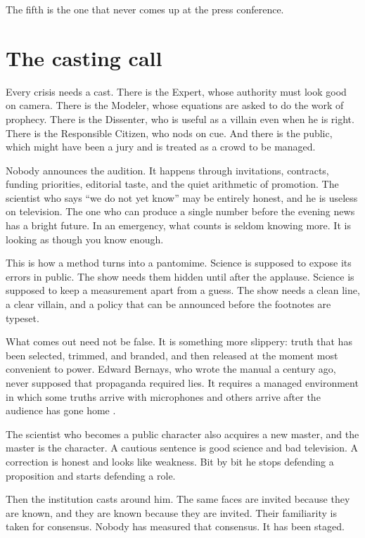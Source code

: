 \documentclass[12pt,a4paper]{book}
\begin{document}
The fifth is the one that never comes up at the press conference.

\section{The casting call}

Every crisis needs a cast. There is the Expert, whose authority must look good on camera. There is the Modeler, whose equations are asked to do the work of prophecy. There is the Dissenter, who is useful as a villain even when he is right. There is the Responsible Citizen, who nods on cue. And there is the public, which might have been a jury and is treated as a crowd to be managed.

Nobody announces the audition. It happens through invitations, contracts, funding priorities, editorial taste, and the quiet arithmetic of promotion. The scientist who says ``we do not yet know'' may be entirely honest, and he is useless on television. The one who can produce a single number before the evening news has a bright future. In an emergency, what counts is seldom knowing more. It is looking as though you know enough.

This is how a method turns into a pantomime. Science is supposed to expose its errors in public. The show needs them hidden until after the applause. Science is supposed to keep a measurement apart from a guess. The show needs a clean line, a clear villain, and a policy that can be announced before the footnotes are typeset.

What comes out need not be false. It is something more slippery: truth that has been selected, trimmed, and branded, and then released at the moment most convenient to power. Edward Bernays, who wrote the manual a century ago, never supposed that propaganda required lies. It requires a managed environment in which some truths arrive with microphones and others arrive after the audience has gone home \cite{bernais-propaganda}.

The scientist who becomes a public character also acquires a new master, and the master is the character. A cautious sentence is good science and bad television. A correction is honest and looks like weakness. Bit by bit he stops defending a proposition and starts defending a role.

Then the institution casts around him. The same faces are invited because they are known, and they are known because they are invited. Their familiarity is taken for consensus. Nobody has measured that consensus. It has been staged.
\end{document}

